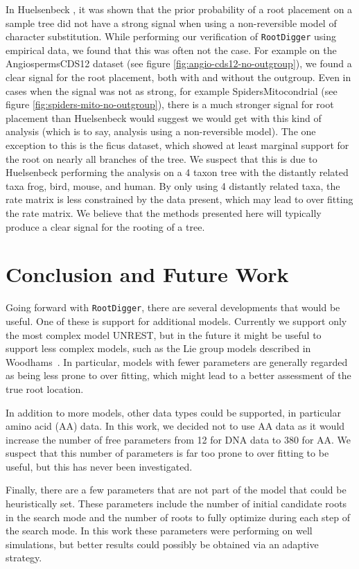 \documentclass{article}
\newcommand{\RootDiggertt}{\texttt{RootDigger}}
\begin{document}
In Huelsenbeck \cite{huelsenbeck_inferring_2002}, it was shown that the prior
probability of a root placement on a sample tree did not have a strong signal
when using a non-reversible model of character substitution.  While performing
our verification of \RootDiggertt{} using empirical data, we found that this was
often not the case. For example on the AngiospermsCDS12 dataset (see figure
\ref{fig:angio-cds12-no-outgroup}), we found a clear signal for the root
placement, both with and without the outgroup. Even in cases when the signal was
not as strong, for example SpidersMitocondrial (see figure
\ref{fig:spiders-mito-no-outgroup}), there is a much stronger signal for root
placement than Huelsenbeck would suggest we would get with this kind of analysis
(which is to say, analysis using a non-reversible model). The one exception to
this is the ficus dataset, which showed at least marginal support for the root
on nearly all branches of the tree. We suspect that this is due to Huelsenbeck
performing the analysis on a 4 taxon tree with the distantly related taxa frog,
bird, mouse, and human. By only using 4 distantly related taxa, the rate matrix
is less constrained by the data present, which may lead to over fitting the rate
matrix. We believe that the methods presented here will typically produce
a clear signal for the rooting of a tree.

\section{Conclusion and Future Work}


Going forward with \RootDiggertt{}, there are several developments that would be
useful. One of these is support for additional models. Currently we support only
the most complex model UNREST, but in the future it might be useful to support
less complex models, such as the Lie group models described in
Woodhams~\cite{woodhams_new_2015}.  In particular, models with fewer parameters
are generally regarded as being less prone to over fitting, which might lead to
a better assessment of the true root location.

In addition to more models, other data types could be supported, in particular
amino acid (AA) data. In this work, we decided not to use AA data as it would
increase the number of free parameters from 12 for DNA data to $380$ for AA. We
suspect that this number of parameters is far too prone to over fitting to be
useful, but this has never been investigated.

Finally, there are a few parameters that are not part of the model that could be
heuristically set. These parameters include the number of initial candidate
roots in the search mode and the number of roots to fully optimize during each
step of the search mode. In this work these parameters were performing on well
simulations, but better results could possibly be obtained via an adaptive
strategy.



\end{document}
